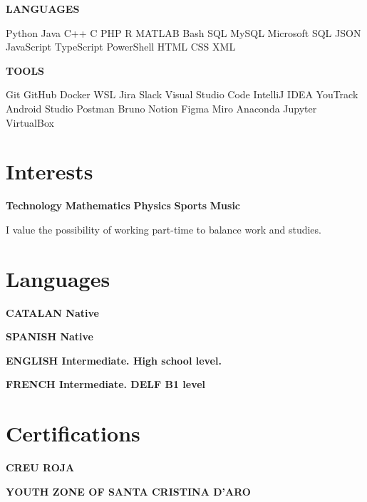 \documentclass[11pt,a4paper]{article}
\newcommand{\runsubsection}[1]{\color{subheadings}\fontsize{12pt}{12pt}\selectfont\bfseries\uppercase{#1}\normalfont}
\newcommand{\descript}[1]{\color{subheadings}\raggedright\scshape\fontsize{11pt}{13pt}\selectfont{#1 \\}\normalfont}
\newcommand{\location}[1]{\color{headings}\raggedright\fontsize{10pt}{12pt}\selectfont{#1\\}\normalfont}
\newcommand{\sectionsep}{\vspace{8pt}}
\begin{document}
\begin{multicols}{2}
\runsubsection{Languages}

Python \textbullet{} Java \textbullet{} C++ \textbullet{} C \textbullet{} PHP \textbullet{} R \textbullet{} MATLAB \textbullet{} Bash \textbullet{} SQL \textbullet{} MySQL \textbullet{} Microsoft SQL \textbullet{} JSON \textbullet{} JavaScript \textbullet{} TypeScript \textbullet{} PowerShell \textbullet{} HTML \textbullet{} CSS \textbullet{} XML
\sectionsep

\runsubsection{Tools}

Git \textbullet{} GitHub \textbullet{} Docker \textbullet{} WSL \textbullet{} Jira \textbullet{} Slack \textbullet{} Visual Studio Code \textbullet{} IntelliJ IDEA \textbullet{} YouTrack \textbullet{} Android Studio \textbullet{} Postman \textbullet{} Bruno \textbullet{} Notion \textbullet{} Figma \textbullet{} Miro \textbullet{} Anaconda \textbullet{} Jupyter \textbullet{} VirtualBox
\sectionsep

\section{Interests}
\textbf{Technology} \textbullet{} \textbf{Mathematics} \textbullet{} \textbf{Physics} \textbullet{} \textbf{Sports} \textbullet{} \textbf{Music}

I value the possibility of working part-time to balance work and studies.

\section{Languages}

\runsubsection{Catalan}
Native
\sectionsep

\runsubsection{Spanish}
Native
\sectionsep

\runsubsection{English}
Intermediate. High school level.
\sectionsep

\runsubsection{French}
Intermediate. DELF B1 level
\sectionsep

\section{Certifications}

\runsubsection{Creu Roja}

\descript{First Aid Course}
\location{2019 | Santa Cristina d'Aro}
\sectionsep

\runsubsection{Youth Zone of Santa Cristina d'Aro}

\descript{Food Handling Course}
\location{2019 | Santa Cristina d'Aro}
\sectionsep


\end{multicols}
\end{document}
